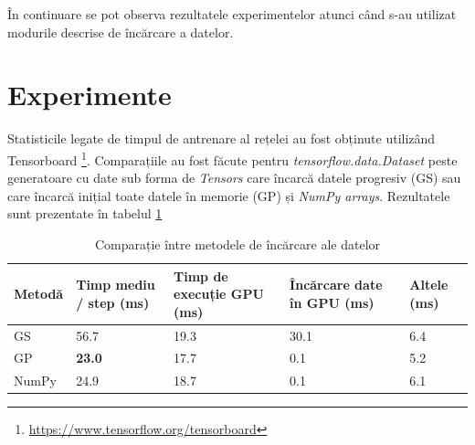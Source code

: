 În continuare se pot observa rezultatele experimentelor atunci când s-au utilizat modurile descrise de încărcare a datelor.
\pagebreak
\section{Experimente}
Statisticile legate de timpul de antrenare al rețelei au fost obținute utilizând Tensorboard \footnote{\url{https://www.tensorflow.org/tensorboard}}. Comparațiile au fost făcute pentru \textit{tensorflow.data.Dataset}
peste generatoare cu date sub forma de \textit{Tensors} care încarcă datele progresiv (GS)
sau care încarcă inițial toate datele în memorie (GP) și \textit{NumPy arrays}. Rezultatele sunt prezentate în tabelul \ref{table:1}

\begin{table}[h!]
\centering
\begin{tabular}{||p{1.5cm} | p{2.5cm} | p{2.5cm} |p{2.5cm} |p{2.5cm}||}
\hline
Metodă & \raggedright Timp mediu / step (ms) & \raggedright Timp de execuție GPU (ms) & \raggedright Încărcare date în GPU (ms) & Altele (ms) \\ [0.5ex]
\hline\hline
GS & 56.7 & 19.3 & 30.1 & 6.4\\
GP & \textbf{23.0} & 17.7 & 0.1 & 5.2\\
NumPy & 24.9 & 18.7 & 0.1 & 6.1\\
\hline
\end{tabular}
\caption{Comparație între metodele de încărcare ale datelor}
\label{table:1}
\end{table}
